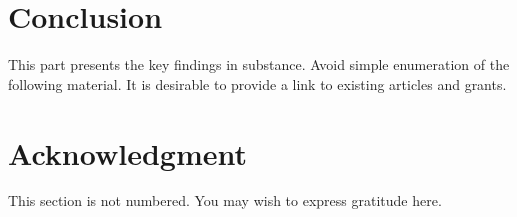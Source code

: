 \documentclass[conference]{IEEEtran}
\begin{document}
\section{Conclusion}
This part presents the key findings in substance. Avoid simple enumeration of the following material. It is desirable to provide a link to existing articles and grants. 

\section*{Acknowledgment}
This section is not numbered. You may wish to express gratitude here.





% 

%
\end{document}
